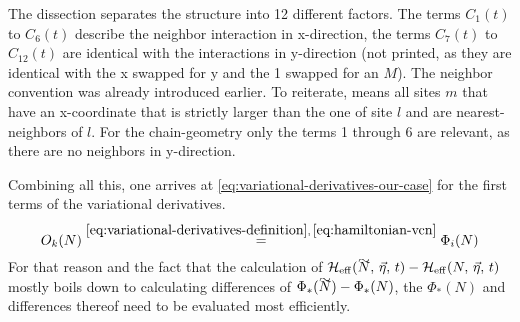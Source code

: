 The dissection separates the structure into 12 different factors. The terms $C_1(t)$ to $C_6(t)$ describe the neighbor interaction in x-direction, the terms $C_7(t)$ to $C_{12}(t)$ are identical with the interactions in y-direction (not printed, as they are identical with the x swapped for y and the 1 swapped for an $M$).
The neighbor convention was already introduced earlier. 
To reiterate,  means \glqq all sites $m$ that have an x-coordinate that is strictly larger than the one of site $l$ and are nearest-neighbors of $l$\grqq{}.
For the chain-geometry only the terms 1 through 6 are relevant, as there are no neighbors in y-direction.

Combining all this, one arrives at \autoref{eq:variational-derivatives-our-case} for the first terms of the variational derivatives.
\begin{equation}
    \label{eq:variational-derivatives-our-case}
    O_{k}(N) \stackrel{\ref{eq:variational-derivatives-definition},\,\ref{eq:hamiltonian-vcn}}{=}
    \Phi_i(N)
\end{equation}
For that reason and the fact that the calculation of $\HeffOft[\vphantom{N}\smash{\tilde{N}},\,\vec{\eta}]-\HeffOft[N,\,\vec{\eta}]$ mostly boils down to calculating differences of $\Phi_\ast(\vphantom{N}\smash{\tilde{N}})-\Phi_\ast(N)$, the $\Phi_\ast(N)$ and differences thereof need to be evaluated most efficiently.